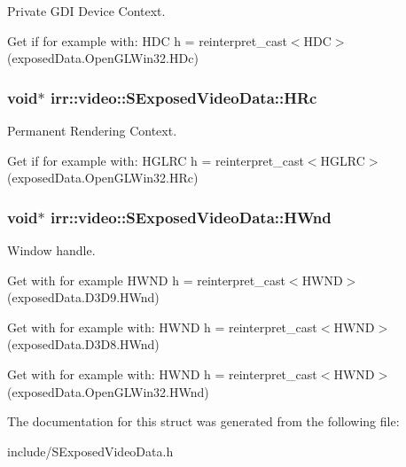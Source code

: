 Private G\+DI Device Context. 

Get if for example with\+: H\+DC h = reinterpret\+\_\+cast$<$\+H\+D\+C$>$(exposed\+Data.\+Open\+G\+L\+Win32.\+H\+Dc) 
\subsubsection[{\texorpdfstring{H\+Rc}{HRc}}]{\setlength{\rightskip}{0pt plus 5cm}void$\ast$ irr\+::video\+::\+S\+Exposed\+Video\+Data\+::\+H\+Rc}\hypertarget{structirr_1_1video_1_1SExposedVideoData_a02e3cb39affd68c68e0d2e416f078e13}{}\label{structirr_1_1video_1_1SExposedVideoData_a02e3cb39affd68c68e0d2e416f078e13}


Permanent Rendering Context. 

Get if for example with\+: H\+G\+L\+RC h = reinterpret\+\_\+cast$<$\+H\+G\+L\+R\+C$>$(exposed\+Data.\+Open\+G\+L\+Win32.\+H\+Rc) 
\subsubsection[{\texorpdfstring{H\+Wnd}{HWnd}}]{\setlength{\rightskip}{0pt plus 5cm}void$\ast$ irr\+::video\+::\+S\+Exposed\+Video\+Data\+::\+H\+Wnd}\hypertarget{structirr_1_1video_1_1SExposedVideoData_a1811289f08d71ca61b6b88b765753b88}{}\label{structirr_1_1video_1_1SExposedVideoData_a1811289f08d71ca61b6b88b765753b88}


Window handle. 

Get with for example H\+W\+ND h = reinterpret\+\_\+cast$<$\+H\+W\+N\+D$>$(exposed\+Data.\+D3\+D9.\+H\+Wnd)

Get with for example with\+: H\+W\+ND h = reinterpret\+\_\+cast$<$\+H\+W\+N\+D$>$(exposed\+Data.\+D3\+D8.\+H\+Wnd)

Get with for example with\+: H\+W\+ND h = reinterpret\+\_\+cast$<$\+H\+W\+N\+D$>$(exposed\+Data.\+Open\+G\+L\+Win32.\+H\+Wnd) 

The documentation for this struct was generated from the following file\+:\begin{DoxyCompactItemize}
\item 
include/S\+Exposed\+Video\+Data.\+h\end{DoxyCompactItemize}
